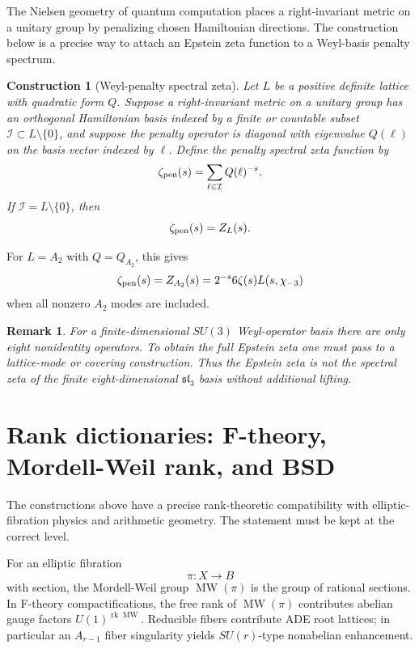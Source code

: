 \documentclass[11pt]{amsart}
\newtheorem{construction}[theorem]{Construction}
\newtheorem{remark}[theorem]{Remark}
\DeclareMathOperator{\MW}{MW}
\newcommand{\rk}{\operatorname{rk}}
\begin{document}
The Nielsen geometry of quantum computation \cite{nielsen} places a right-invariant metric on a unitary group by penalizing chosen Hamiltonian directions.  The construction below is a precise way to attach an Epstein zeta function to a Weyl-basis penalty spectrum.

\begin{construction}[Weyl-penalty spectral zeta]
Let $L$ be a positive definite lattice with quadratic form $Q$.  Suppose a right-invariant metric on a unitary group has an orthogonal Hamiltonian basis indexed by a finite or countable subset $\mathcal I\subset L\setminus\{0\}$, and suppose the penalty operator is diagonal with eigenvalue $Q(\ell)$ on the basis vector indexed by $\ell$.  Define the penalty spectral zeta function by
\[
       \zeta_{\rm pen}(s)=\sum_{\ell\in\mathcal I}Q(\ell)^{-s}.
\]
If $\mathcal I=L\setminus\{0\}$, then
\[
       \zeta_{\rm pen}(s)=Z_L(s).
\]
\end{construction}

For $L=A_2$ with $Q=Q_{A_2}$, this gives
\[
       \zeta_{\rm pen}(s)=Z_{A_2}(s)=2^{-s}6\zeta(s)L(s,\chi_{-3})
\]
when all nonzero $A_2$ modes are included.

\begin{remark}
For a finite-dimensional $SU(3)$ Weyl-operator basis there are only eight nonidentity operators.  To obtain the full Epstein zeta one must pass to a lattice-mode or covering construction.  Thus the Epstein zeta is not the spectral zeta of the finite eight-dimensional $\mathfrak{sl}_3$ basis without additional lifting.
\end{remark}

\section{Rank dictionaries: F-theory, Mordell-Weil rank, and BSD}

The constructions above have a precise rank-theoretic compatibility with elliptic-fibration physics and arithmetic geometry.  The statement must be kept at the correct level.

For an elliptic fibration \cite{vafa,arithmeticgeometry}
\[
       \pi:X\to B
\]
with section, the Mordell-Weil group $\MW(\pi)$ is the group of rational sections.  In F-theory compactifications, the free rank of $\MW(\pi)$ contributes abelian gauge factors $U(1)^{\rk \MW}$.  Reducible fibers contribute ADE root lattices; in particular an $A_{r-1}$ fiber singularity yields $SU(r)$-type nonabelian enhancement.
\end{document}

